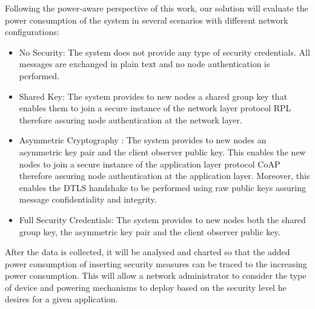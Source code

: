Following the power-aware perspective of this work, our solution will evaluate the power consumption of the system in several scenarios with different network configurations:

\begin{itemize}
	\item No Security: The system does not provide any type of security credentials. All messages are exchanged in plain text and no node authentication is performed.
	\item Shared Key: The system provides to new nodes a shared group key that enables them to join a secure instance of the network layer protocol RPL therefore assuring node authentication at the network layer.
	\item Asymmetric Cryptography : The system provides to new nodes an asymmetric key pair and the client observer public key. This enables the new nodes to join a secure instance of the application layer protocol \ac{CoAP} therefore assuring node authentication at the application layer. Moreover, this enables the \ac{DTLS} handshake to be performed using raw public keys assuring message confidentiality and integrity.
	\item Full Security Credentials: The system provides to new nodes both the shared group key, the asymmetric key pair and the client observer public key. 
\end{itemize}

After the data is collected, it will be analysed and charted so that the added power consumption of inserting security measures can be traced to the increasing power consumption. This will allow a network administrator to consider the type of device and powering mechanisms to deploy based on the security level he desires for a given application.